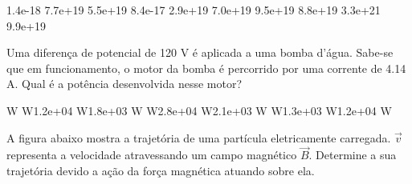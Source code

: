 \documentclass[12pt, addpoints]{exam}
\begin{document}
\begin{questions}
\begin{multicols*}{2}
\begin{oneparchoices}
\choice 1.4e-18 \choice 7.7e+19 \choice 5.5e+19 \choice 8.4e-17 \choice 2.9e+19 \choice 7.0e+19 \choice 9.5e+19 \choice 8.8e+19 \choice 3.3e+21 \choice 9.9e+19 
\end{oneparchoices}\question Uma diferença de potencial de 120 V é aplicada a uma bomba d’água. Sabe-se que em funcionamento, o motor da bomba é percorrido por uma corrente de    4.14 A. Qual é a potência desenvolvida nesse motor?

\begin{oneparchoices}
 W W\choice 1.2e+04 W\choice 1.8e+03 W W\choice 2.8e+04 W\choice 2.1e+03 W W\choice 1.3e+03 W\choice 1.2e+04 W
\end{oneparchoices}\question A ﬁgura abaixo mostra a trajetória de uma partícula eletricamente carregada. $\vec{{v}}$ representa a velocidade atravessando um campo magnético $\vec{{B}}$. Determine a sua trajetória devido a ação da força magnética atuando sobre ela.
        
        \begin{center}
            \begin{minipage}[c]{0.5\linewidth}
            \end{minipage}
        \end{center}

        


\end{multicols*}
\end{questions}
\end{document}
